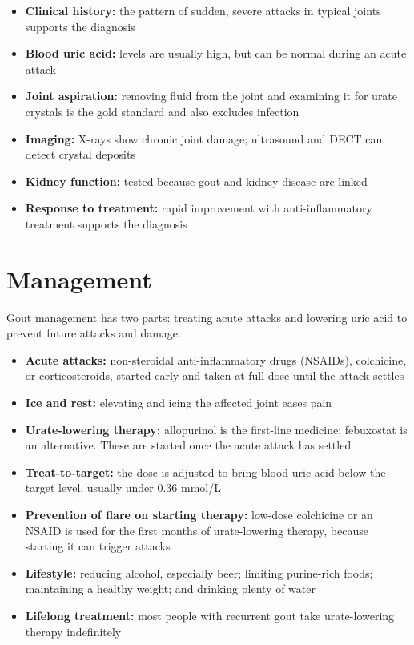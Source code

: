 \begin{itemize}
    \item \textbf{Clinical history:} the pattern of sudden, severe attacks in typical joints supports the diagnosis
    \item \textbf{Blood uric acid:} levels are usually high, but can be normal during an acute attack
    \item \textbf{Joint aspiration:} removing fluid from the joint and examining it for urate crystals is the gold standard and also excludes infection
    \item \textbf{Imaging:} X-rays show chronic joint damage; ultrasound and DECT can detect crystal deposits
    \item \textbf{Kidney function:} tested because gout and kidney disease are linked
    \item \textbf{Response to treatment:} rapid improvement with anti-inflammatory treatment supports the diagnosis
\end{itemize}

\section*{Management}
Gout management has two parts: treating acute attacks and lowering uric acid to prevent future attacks and damage.

\begin{itemize}
    \item \textbf{Acute attacks:} non-steroidal anti-inflammatory drugs (NSAIDs), colchicine, or corticosteroids, started early and taken at full dose until the attack settles
    \item \textbf{Ice and rest:} elevating and icing the affected joint eases pain
    \item \textbf{Urate-lowering therapy:} allopurinol is the first-line medicine; febuxostat is an alternative. These are started once the acute attack has settled
    \item \textbf{Treat-to-target:} the dose is adjusted to bring blood uric acid below the target level, usually under 0.36 mmol/L
    \item \textbf{Prevention of flare on starting therapy:} low-dose colchicine or an NSAID is used for the first months of urate-lowering therapy, because starting it can trigger attacks
    \item \textbf{Lifestyle:} reducing alcohol, especially beer; limiting purine-rich foods; maintaining a healthy weight; and drinking plenty of water
    \item \textbf{Lifelong treatment:} most people with recurrent gout take urate-lowering therapy indefinitely
\end{itemize}

